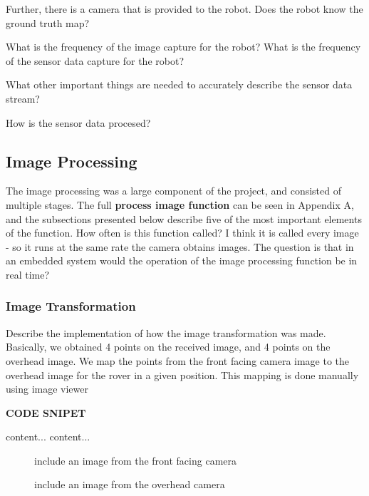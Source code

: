 \documentclass[a4paper]{article}
\begin{document}
Further, there is a camera that is provided to the robot. Does the robot know the ground truth map?

What is the frequency of the image capture for the robot? What is the frequency of the sensor data capture for the robot?

What other important things are needed to accurately describe the sensor data stream?

How is the sensor data procesed?

\subsection{Image Processing}
The image processing was a large component of the project, and consisted of multiple stages. The full \textbf{process image function} can be seen in Appendix A, and the subsections presented below describe five of the most important elements of the function. How often is this function called? I think it is called every image - so it runs at the same rate the camera obtains images. The question is that in an embedded system would the operation of the image processing function be in real time?

\subsubsection{Image Transformation}
Describe the implementation of how the image transformation was made. Basically, we obtained 4 points on the received image, and 4 points on the overhead image. We map the points from the front facing camera image to the overhead image for the rover in a given position. This mapping is done manually using image viewer

\textbf{CODE SNIPET}

\begin{table}
\caption{include a table which has the points that we need to map to the other points}
\begin{tabular}{content...}
content...
\end{tabular}
\end{table}

\begin{figure}
\begin{minipage}{0.45\linewidth}
\centering
\caption{include an image from the front facing camera}
\end{minipage}
\begin{minipage}{0.45\linewidth}
\centering
\caption{include an image from the overhead camera}
\end{minipage}
\end{figure}
\end{document}
